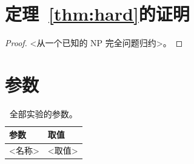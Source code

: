 \section{定理~\ref{thm:hard}的证明}
\label{app:proof-hard}
\begin{proof}
<从一个已知的 NP 完全问题归约>。
\end{proof}

\section{参数}
\label{app:params}
\begin{table}[h]
\centering
\caption{全部实验的参数。}
\label{tab:params}
\footnotesize
\begin{tabular}{@{}ll@{}}
\toprule
参数 & 取值 \\
\midrule
<名称> & <取值> \\
\bottomrule
\end{tabular}
\end{table}
